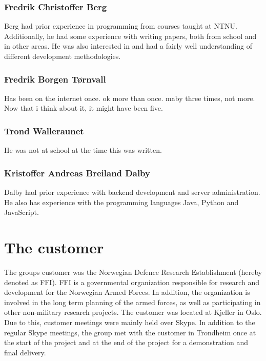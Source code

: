 \subsubsection{Fredrik Christoffer Berg}

Berg had prior experience in programming from courses taught at NTNU. Additionally, he had some experience with writing papers, both from school and in other areas. He was also interested in and had a fairly well understanding of different development methodologies.

\subsubsection{Fredrik Borgen Tørnvall}
Has been on the internet once. ok more than once. maby three times, not more. Now that i think about it, it might have been five.

\subsubsection{Trond Walleraunet}

He was not at school at the time this was written.

\subsubsection{Kristoffer Andreas Breiland Dalby}
Dalby had prior experience with backend development and server administration. He also has experience with the programming languages Java, Python and JavaScript.

\section{The customer}
\label{sec:introduction-the_customer}

The groups customer was the Norwegian Defence Research Establishment (hereby denoted as FFI). FFI is a governmental organization responsible for research and development for the Norwegian Armed Forces. In addition, the organization is involved in the long term planning of the armed forces, as well as participating in other non-military research projects. The customer was located at Kjeller in Oslo. Due to this, customer meetings were mainly held over Skype. In addition to the regular Skype meetings, the group met with the customer in Trondheim once at the start of the project and at the end of the project for a demonstration and final delivery.

